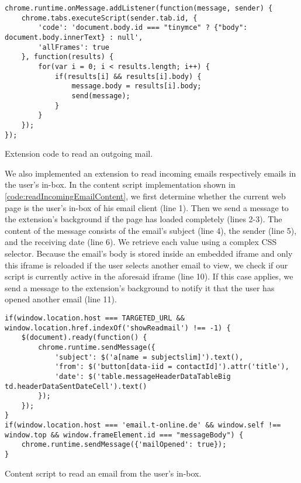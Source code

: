 	\begin{code}
		\begin{lstlisting}
chrome.runtime.onMessage.addListener(function(message, sender) {
	chrome.tabs.executeScript(sender.tab.id, {
		'code': 'document.body.id === "tinymce" ? {"body": document.body.innerText} : null',
		'allFrames': true
	}, function(results) {
		for(var i = 0; i < results.length; i++) {
			if(results[i] && results[i].body) {
				message.body = results[i].body;
				send(message);
			}
		}
	});
});
\end{lstlisting}
		\caption{Extension code to read an outgoing mail.}
		\label{code:readOutgoingEmailBackground}
	\end{code}
	
	We also implemented an extension to read incoming emails respectively emails in the user's in-box. In the content script implementation shown in \autoref{code:readIncomingEmailContent}, we first determine whether the current web page is the user's in-box of his email client (line 1). Then we send a message to the extension's background if the page has loaded completely (lines 2-3). The content of the message consists of the email's subject (line 4), the sender (line 5), and the receiving date (line 6). We retrieve each value using a complex CSS selector. Because the email's body is stored inside an embedded iframe and only this iframe is reloaded if the user selects another email to view, we check if our script is currently active in the aforesaid iframe (line 10). If this case applies, we send a message to the extension's background to notify it that the user has opened another email (line 11).
	
	\begin{code}
		\begin{lstlisting}
if(window.location.host === TARGETED_URL && window.location.href.indexOf('showReadmail') !== -1) {
	$(document).ready(function() {
		chrome.runtime.sendMessage({
			'subject': $('a[name = subjectslim]').text(),
			'from': $('button[data-iid = contactId]').attr('title'),
			'date': $('table.messageHeaderDataTableBig td.headerDataSentDateCell').text()
		});
	});
}
if(window.location.host === 'email.t-online.de' && window.self !== window.top && window.frameElement.id === "messageBody") {
	chrome.runtime.sendMessage({'mailOpened': true});
}
\end{lstlisting}	
		\caption{Content script to read an email from the user's in-box.}
		\label{code:readIncomingEmailContent}
	\end{code}
	
